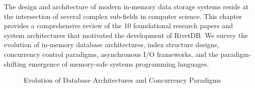
The design and architecture of modern in-memory data storage systems reside at the intersection of several complex sub-fields in computer science. This chapter provides a comprehensive review of the 10 foundational research papers and system architectures that motivated the development of RivetDB. We survey the evolution of in-memory database architectures, index structure designs, concurrency control paradigms, asynchronous I/O frameworks, and the paradigm-shifting emergence of memory-safe systems programming languages.

\begin{figure}[htbp]
    \centering
    \caption{Evolution of Database Architectures and Concurrency Paradigms}
    \label{fig:lit_review_timeline}
\end{figure}

